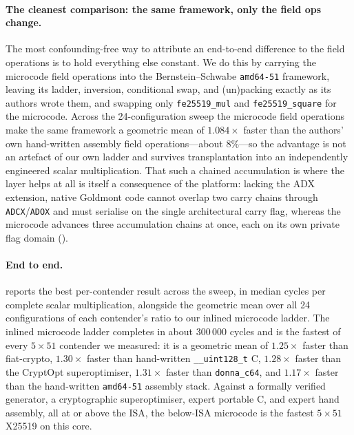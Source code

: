 \paragraph{The cleanest comparison: the same framework, only the field ops
change.} The most confounding-free way to attribute an end-to-end difference to
the field operations is to hold everything else constant. We do this by carrying
the microcode field operations into the Bernstein--Schwabe \texttt{amd64-51}
framework, leaving its ladder, inversion, conditional swap, and (un)packing
exactly as its authors wrote them, and swapping only \texttt{fe25519\_mul} and
\texttt{fe25519\_square} for the microcode. Across the 24-configuration sweep the
microcode field operations make the same framework a geometric mean of
$1.084\times$ faster than the authors' own hand-written assembly field
operations---about $8\%$---so the advantage is not an artefact of our own ladder
and survives transplantation into an independently engineered scalar
multiplication. That such a chained accumulation is where the layer helps at all
is itself a consequence of the platform: lacking the ADX extension, native
Goldmont code cannot overlap two carry chains through \texttt{ADCX}/\texttt{ADOX}
and must serialise on the single architectural carry flag, whereas the microcode
advances three accumulation chains at once, each on its own private flag domain
().

\paragraph{End to end.}
 reports the best per-contender result across the
sweep, in median cycles per complete scalar multiplication, alongside the
geometric mean over all 24 configurations of each contender's ratio to our inlined
microcode ladder. The inlined microcode ladder completes in about 300\,000 cycles
and is the fastest of every $5\times51$ contender we measured: it is a geometric
mean of $1.25\times$ faster than fiat-crypto, $1.30\times$ faster than
hand-written \texttt{\_\_uint128\_t} C, $1.28\times$ faster than the CryptOpt
superoptimiser, $1.31\times$ faster than \texttt{donna\_c64}, and $1.17\times$
faster than the hand-written \texttt{amd64-51} assembly stack. Against a formally
verified generator, a cryptographic superoptimiser, expert portable C, and expert
hand assembly, all at or above the ISA, the below-ISA microcode is the fastest
$5\times51$ X25519 on this core.

